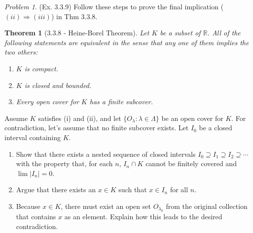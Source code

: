 \documentclass[11pt,twoside, reqno]{amsart}
\newtheorem{Thm}{Theorem}
\theoremstyle{remark}
\newtheorem{Prob}{Problem}
\def\R{\mathbb R}
\renewcommand{\implies}{\Rightarrow}
\begin{document}
\begin{Prob}(Ex. 3.3.9) Follow these steps to prove the final implication ($(ii) \implies (iii)$) in Thm 3.3.8.
\begin{Thm}[3.3.8 - Heine-Borel Theorem]
Let $K$ be a subset of $\R$. All of the following statements are equivalent in the sense that any one of them implies the two others:
\begin{enumerate}
    \item [(i)] $K$ is compact.
    \item [(ii)] $K$ is closed and bounded.
    \item [(iii)] Every open cover for $K$ has a finite subcover.
\end{enumerate}
\end{Thm}

Assume $K$ satisfies (i) and (ii), and let $\{O_\lambda : \lambda \in \Lambda\}$ be an open cover for $K$. For contradiction, let's assume that no finite subcover exists. Let $I_0$ be a closed interval containing $K$.
\begin{enumerate}
    \item [(a)] Show that there exists a nested sequence of closed intervals $I_0 \supseteq I_1 \supseteq I_2 \supseteq \cdots$ with the property that, for each $n$, $I_n \cap K$ cannot be finitely covered and $\lim |I_n| = 0$.
    \item [(b)] Argue that there exists an $x \in K$ such that $x \in I_n$ for all $n$.
    \item [(c)] Because $x \in K$, there must exist an open set $O_{\lambda_0}$ from the original collection that contains $x$ as an element. Explain how this leads to the desired contradiction.
\end{enumerate}
\end{Prob}
\end{document}
